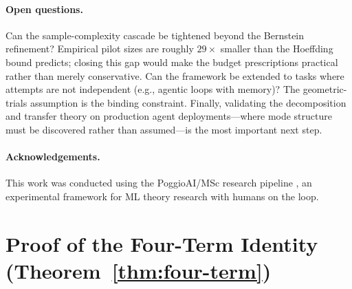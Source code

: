 \documentclass[11pt]{article}
\begin{document}
\paragraph{Open questions.}
Can the sample-complexity cascade be tightened beyond the Bernstein
refinement?  Empirical pilot sizes are roughly $29\times$ smaller than
the Hoeffding bound predicts; closing this gap would make the budget
prescriptions practical rather than merely conservative.
Can the framework be extended to tasks where attempts are not independent
(e.g., agentic loops with memory)?  The geometric-trials assumption is
the binding constraint.
Finally, validating the decomposition and transfer theory on production
agent deployments---where mode structure must be discovered rather than
assumed---is the most important next step.

\paragraph{Acknowledgements.}
This work was conducted using the PoggioAI/MSc research pipeline
\citep{PoggioAIMSc_2026}, an experimental framework for ML theory
research with humans on the loop.




\newpage



\appendix

\section{Proof of the Four-Term Identity (Theorem~\ref{thm:four-term})}
\label{app:four-term}
\end{document}
